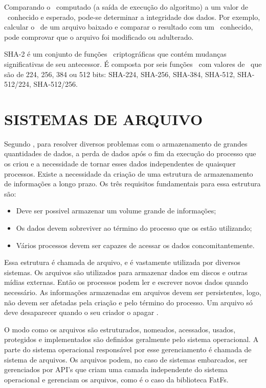 Comparando o \hash\ computado (a saída de execução do algoritmo) a um valor de \hash\ conhecido e esperado, pode-se determinar a integridade dos dados. Por exemplo, calcular o \hash\ de um arquivo baixado e comparar o resultado com um \hash\ conhecido, pode comprovar que o arquivo foi modificado ou adulterado.

SHA-2 é um conjunto de funções \hash\ criptográficas que contém mudanças significativas de seu antecessor. É composta por seis funções \hash\ com valores de \hash\ que são de 224, 256, 384 ou 512 bits: SHA-224, SHA-256, SHA-384, SHA-512, SHA-512/224, SHA-512/256.



\section{SISTEMAS DE ARQUIVO}
Segundo , para resolver diversos problemas com o armazenamento de grandes quantidades de dados, a perda de dados após o fim da execução do processo que os criou e a necessidade de tornar esses dados independentes de quaisquer processos. Existe a necessidade da criação de uma estrutura de armazenamento de informações a longo prazo. Os três requisitos fundamentais para essa estrutura são:

\begin{itemize}
    \item Deve ser possivel armazenar um volume grande de informações;
    \item Os dados devem sobreviver ao término do processo que os estão utilizando;
    \item Vários processos devem ser capazes de acessar os dados concomitantemente.
\end{itemize}

Essa estrutura é chamada de arquivo, e é vastamente utilizada por diversos sistemas. Os arquivos são utilizados para armazenar dados em discos e outras mídias externas. Então os processos podem ler e escrever novos dados quando necessário. As informações armazenadas em arquivos devem ser persistentes, logo, não devem ser afetadas pela criação e pelo término do processo. Um arquivo só deve desaparecer quando o seu criador o apagar \cite{tanenbaumSO}.

O modo como os arquivos são estruturados, nomeados, acessados, usados, protegidos e implementados são definidos geralmente pelo sistema operacional. A parte do sistema operacional responsável por esse gerenciamento é chamada de sistema de arquivos. Os arquivos podem, no caso de sistemas embarcados, ser gerenciados por API's que criam uma camada independente do sistema operacional e gerenciam os arquivos, como é o caso da biblioteca FatFs. 

